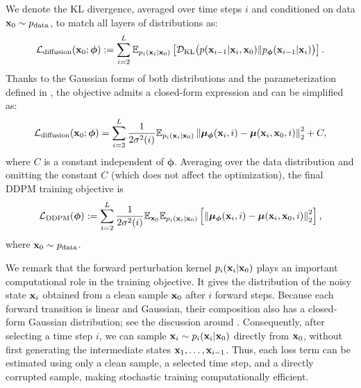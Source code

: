 We denote the KL divergence, averaged over time steps $i$ and conditioned on data ${\mathbf{x}}_0 \sim p_{\text{data}}$, to match all layers of distributions as:
\begin{align}\label{eq:ddpm-diffusion}
    \mathcal{L}_{\text{diffusion}}({\mathbf{x}}_0;\bm{\phi}) := \sum_{i=2}^L \mathbb{E}_{p_i({\mathbf{x}}_i|{\mathbf{x}}_0)}\left[\mathcal{D}_{\text{KL}}\big(p({\mathbf{x}}_{i-1}|{\mathbf{x}}_i, {\mathbf{x}}_0)  \Vert  p_{\bm{\phi}}({\mathbf{x}}_{i-1}|{\mathbf{x}}_i)\big)\right].
\end{align}
Thanks to the Gaussian forms of both distributions and the parameterization defined in , the objective admits a closed-form expression and can be simplified as:
\begin{align}\label{eq:ddpm-diffusion-simp}
    \mathcal{L}_{\text{diffusion}}({\mathbf{x}}_0;\bm{\phi}) = \sum_{i=2}^L \frac{1}{2\sigma^2(i)}  \mathbb{E}_{p_i({\mathbf{x}}_i|{\mathbf{x}}_0)}\left\| \bm{\mu}_{\bm{\phi}}({\mathbf{x}}_i, i) - \bm{\mu}({\mathbf{x}}_i, {\mathbf{x}}_0, i) \right\|_2^2 + C,
\end{align}
where $C$ is a constant independent of $\bm{\phi}$. Averaging over the data distribution and omitting the constant $C$ (which does not affect the optimization), the final DDPM training objective is
\begin{align}
\begin{aligned}
    \label{eq:ddpm-mean-loss}
    \mathcal{L}_{\text{DDPM}}(\bm{\phi}) := \sum_{i=2}^L \frac{1}{2\sigma^2(i)}  \mathbb{E}_{{\mathbf{x}}_0} \mathbb{E}_{p_i({\mathbf{x}}_i|{\mathbf{x}}_0)} \left[ \left\| \bm{\mu}_{\bm{\phi}}(\mathbf{x}_i, i) - \bm{\mu}(\mathbf{x}_i, {\mathbf{x}}_0, i) \right\|_2^2 \right],
\end{aligned}
\end{align}
where ${\mathbf{x}}_0\sim p_{\mathrm{data}}$.

We remark that the forward perturbation kernel $p_i({\mathbf{x}}_i | {\mathbf{x}}_0)
$
plays an important computational role in the training objective. It gives the
distribution of the noisy state ${\mathbf{x}}_i$ obtained from a clean sample ${\mathbf{x}}_0$
after $i$ forward steps. Because each forward transition is linear and
Gaussian, their composition also has a closed-form Gaussian distribution; see
the discussion around . Consequently, after selecting a
time step $i$, we can sample ${\mathbf{x}}_i \sim p_i({\mathbf{x}}_i | {\mathbf{x}}_0)
$
directly from ${\mathbf{x}}_0$, without first generating the intermediate states
${\mathbf{x}}_1,\ldots,{\mathbf{x}}_{i-1}$.  Thus, each
loss term can be estimated using only a clean sample, a selected time step, and
a directly corrupted sample, making stochastic training computationally
efficient.


